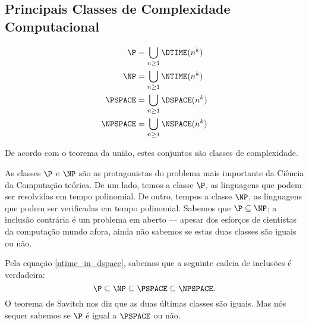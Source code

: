 \subsection{Principais Classes de Complexidade Computacional}
\label{classes_complexidade}

\begin{definition}
    \begin{align*}
        \P &= \bigcup_{n \geq 1} \DTIME(n^k) \\
        \NP &= \bigcup_{n \geq 1} \NTIME(n^k) \\
        \PSPACE &= \bigcup_{n \geq 1} \DSPACE(n^k) \\
        \NPSPACE &= \bigcup_{n \geq 1} \NSPACE(n^k) \\
    \end{align*}
\end{definition}

De acordo com o teorema da união,
estes conjuntos são classes de complexidade.

As classes $\P$ e $\NP$ são as protagonistas
do problema mais importante da Ciência da Computação teórica.
De um lado, temos a classe $\P$,
as linguagens que podem ser resolvidas em tempo polinomial.
De outro, tempos a classe $\NP$,
as linguagens que podem ser verificadas em tempo polinomial.
Sabemos que $\P \subseteq \NP$;
a inclusão contrária é um problema em aberto
--- apesar dos esforços de cientistas da computação mundo afora,
ainda não sabemos se estas duas classes são iguais ou não.

Pela equação \ref{ntime_in_dspace},
sabemos que a seguinte cadeia de inclusões é verdadeira:
\begin{equation*}
    \P \subseteq \NP \subseteq \PSPACE \subseteq \NPSPACE.
\end{equation*}
O teorema de Savitch nos diz que as duas últimas classes são iguais.
Mas nós sequer sabemos se $\P$ é igual a $\PSPACE$ ou não.
